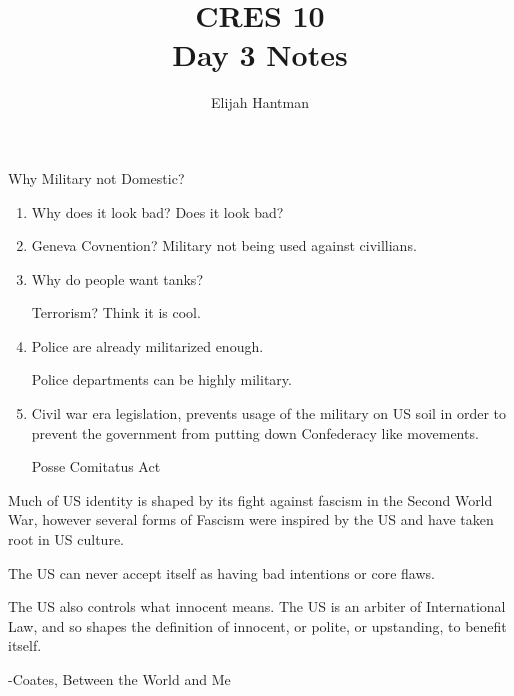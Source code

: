 \documentclass{report}
\title{\Huge{CRES 10}\\Day 3 Notes}
\author{\huge{Elijah Hantman}}
\date{}
\begin{document}
\maketitle
\newpage

{\large Why Military not Domestic?}
\begin{enumerate}
    \item Why does it look bad?
        Does it look bad?
    \item Geneva Covnention? Military
        not being used against civillians.
    \item Why do people want tanks?
        
        Terrorism?
        Think it is cool.

    \item Police are already militarized enough.

        Police departments can be highly military.

    \item Civil war era legislation, prevents usage of
        the military on US soil in order to prevent the
        government from putting down Confederacy like
        movements.

        Posse Comitatus Act
\end{enumerate}


Much of US identity is shaped by its fight against
fascism in the Second World War, however several
forms of Fascism were inspired by the US and have
taken root in US culture.

The US can never accept itself as having bad intentions
or core flaws.


\begin{mdframed}
    The US also controls what innocent means.
    The US is an arbiter of International Law, 
    and so shapes the definition of innocent, or polite,
    or upstanding, to benefit itself.

    \vspace{10}


    -Coates, Between the World and Me


\end{mdframed}
\end{document}
